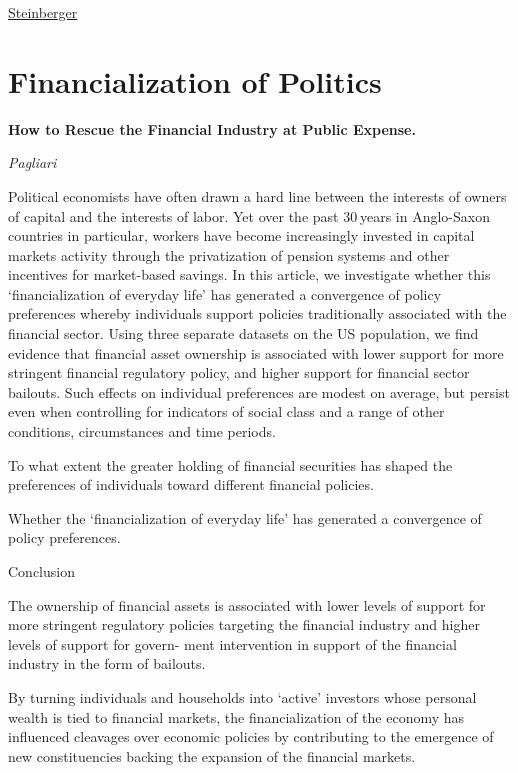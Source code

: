 \documentclass[
]{book}
\begin{document}
\href{https://jksteinberger.medium.com/the-bear-the-tiger-and-the-trade-unionist-4b25df5fb3a9}{Steinberger}

\hypertarget{financialization-of-politics}{%
\section{Financialization of Politics}\label{financialization-of-politics}}

\textbf{How to Rescue the Financial Industry at Public Expense.}

\emph{Pagliari}

Political economists have often drawn a hard line between the interests of owners of capital and the interests of labor. Yet over the past 30 years in Anglo-Saxon countries in particular, workers have become increasingly invested in capital markets activity through the privatization of pension systems and other incentives for market-based savings. In this article, we investigate whether this `financialization of everyday life' has generated a convergence of policy preferences whereby individuals support policies traditionally associated with the financial sector. Using three separate datasets on the US population, we find evidence that financial asset ownership is associated with lower support for more stringent financial regulatory policy, and higher support for financial sector bailouts. Such effects on individual preferences are modest on average, but persist even when controlling for indicators of social class and a range of other conditions, circumstances and time periods.

To what extent the greater holding of financial securities has shaped the preferences of
individuals toward different financial policies.

Whether the `financialization of everyday life' has generated a convergence of policy preferences.

Conclusion

The ownership of financial assets is associated with lower levels of support for more stringent
regulatory policies targeting the financial industry and higher levels of support for govern-
ment intervention in support of the financial industry in the form of bailouts.

By turning individuals and households into `active' investors
whose personal wealth is tied to financial markets, the financialization of the economy has
influenced cleavages over economic policies by contributing to the emergence of new
constituencies backing the expansion of the financial markets.
\end{document}
